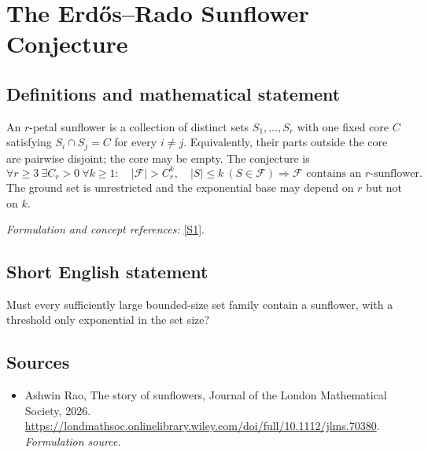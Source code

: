 \documentclass[11pt]{article}
\begin{document}
\section*{\texorpdfstring{The Erdős–Rado Sunflower Conjecture}{The Erdős–Rado Sunflower Conjecture}}\label{statement}
\subsection{Definitions and mathematical statement}
An $r$-petal sunflower is a collection of distinct sets $S_1,\ldots,S_r$ with one fixed core $C$ satisfying $S_i\cap S_j=C$ for every $i\ne j$. Equivalently, their parts outside the core are pairwise disjoint; the core may be empty. The conjecture is
\[
 \forall r\ge3\ \exists C_r>0\ \forall k\ge1:\quad
 |\mathcal F|>C_r^k,\quad|S|\le k\ (S\in\mathcal F)
 \Rightarrow\mathcal F\text{ contains an }r\text{-sunflower}.
\]
The ground set is unrestricted and the exponential base may depend on $r$ but not on $k$.
\par\smallskip\textit{Formulation and concept references:} \href{https://londmathsoc.onlinelibrary.wiley.com/doi/full/10.1112/jlms.70380}{[S1]}.

\subsection{Short English statement}
Must every sufficiently large bounded-size set family contain a sunflower, with a threshold only exponential in the set size?
\subsection{Sources}
\begin{itemize}
\item[S1]Ashwin Rao, The story of sunflowers, Journal of the London Mathematical Society, 2026.
\url{https://londmathsoc.onlinelibrary.wiley.com/doi/full/10.1112/jlms.70380}.
\textit{Formulation source.}
\end{itemize}
\end{document}
